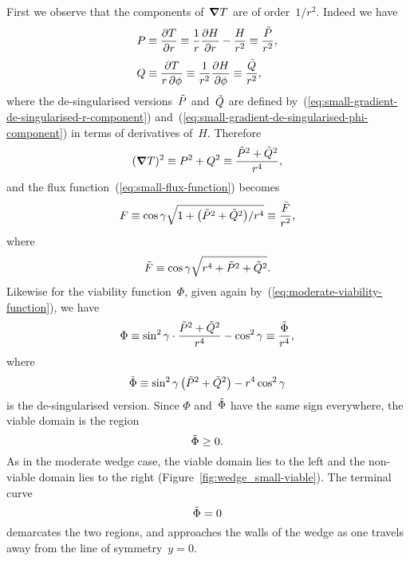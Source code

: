 First we observe that the components of~$\mathop{}\!\boldsymbol{\mathbf{\nabla}} T$ are of order~$1 / r^2$.
Indeed we have
\begin{align}
  P &\ideq \pder{T}{r}
    \ideq \frac{1}{r} \pder{H}{r} - \frac{H}{r^2}
    \ideq \frac{\desing{P}}{r^2},
      \label{eq:small-gradient-r-component} \\[\tallspace]
  Q &\ideq \frac{\pd T}{r \pd\phi}
    \ideq \frac{1}{r^2} \pder{H}{\phi}
    \ideq \frac{\desing{Q}}{r^2},
      \label{eq:small-gradient-phi-component}
\end{align}
where the de-singularised versions~$\tilde{P}$ and~$\tilde{Q}$
are defined by~(\ref{eq:small-gradient-de-singularised-r-component})
and~(\ref{eq:small-gradient-de-singularised-phi-component})
in terms of derivatives of~$H$.
Therefore
\begin{equation}
  (\mathop{}\!\boldsymbol{\mathbf{\nabla}} T)^2
    \equiv P^2 + Q^2
    \equiv \frac{\tilde{P}^2 + \tilde{Q}^2}{r^4},
  \label{eq:small-gradient-squared}
\end{equation}
and the flux function~(\ref{eq:small-flux-function}) becomes
\begin{equation}
  F
    \ideq
      \cos\gamma
      \sqrt{1 + \roundbr*{\desing{P}^2 + \desing{Q}^2} / r^4}
    \ideq
      \frac{\desing{F}}{r^2},
    \label{eq:small-flux-function-singular}
\end{equation}
where
\begin{equation}
  \tilde{F} \equiv \cos\gamma \sqrt{r^4 + \tilde{P}^2 + \tilde{Q}^2}.
  \label{eq:small-flux-function-de-singularised}
\end{equation}
Likewise for the viability function~$\Phi$,
given again by~(\ref{eq:moderate-viability-function}),
we have
\begin{equation}
  \Phi
    \equiv
      \sin^2\gamma \cdot \frac{\tilde{P}^2 + \tilde{Q}^2}{r^4}
      - \cos^2\gamma
    \equiv
      \frac{\tilde{\Phi}}{r^4},
    \label{eq:small-viability-function-singular}
\end{equation}
where
\begin{equation}
  \desing{\Phi} \ideq
    \sin^2\gamma \, \roundbr*{\desing{P}^2 + \desing{Q}^2} - r^4 \cos^2\gamma
  \label{eq:small-viability-function-de-singularised}
\end{equation}
is the de-singularised version.
Since $\Phi$ and~$\tilde{\Phi}$ have the same sign everywhere,
the viable domain is the region
\begin{equation}
  \tilde{\Phi} \ge 0.
  \label{eq:small-viable-domain}
\end{equation}
As in the moderate wedge case,
the viable domain lies to the left
and the non-viable domain lies to the right
(Figure~\ref{fig:wedge_small-viable}).
The terminal curve
\begin{equation}
  \tilde{\Phi} = 0
  \label{eq:small-terminal-curve}
\end{equation}
demarcates the two regions,
and approaches the walls of the wedge
as one travels away from the line of symmetry~$y = 0$.

